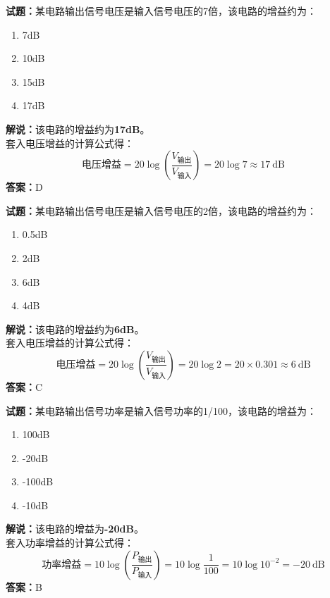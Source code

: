 \documentclass{ctexbook}
\begin{document}
\noindent\textbf{试题：}某电路输出信号电压是输入信号电压的7倍，该电路的增益约为：
\begin{enumerate}[leftmargin=3em]
	\item 7dB
	\item 10dB
	\item 15dB
	\item 17dB%
\end{enumerate}
\noindent\textbf{解说：}该电路的增益约为\textbf{17dB}。\\
套入电压增益的计算公式得：
$$\mbox{电压增益}=20 \log \left( {\frac{V_{ \mbox{输出} }}{V_{ \mbox{输入} }}} \right)=20 \log 7 \approx17 \ \mathrm{dB}$$
\noindent\textbf{答案：}D



\bigskip


\noindent\textbf{试题：}某电路输出信号电压是输入信号电压的2倍，该电路的增益约为：
\begin{enumerate}[leftmargin=3em]
\item 0.5dB
\item 2dB
\item 6dB
\item 4dB
\end{enumerate}
\noindent\textbf{解说：}该电路的增益约为\textbf{6dB}。\\
套入电压增益的计算公式得：
$$\mbox{电压增益}=20 \log \left( {\frac{V_{ \mbox{输出} }}{V_{ \mbox{输入} }}} \right)=20 \log 2 = 20 \times 0.301 \approx 6 \ \mathrm{dB}$$
\noindent\textbf{答案：}C





\bigskip


\noindent\textbf{试题：}某电路输出信号功率是输入信号功率的1/100，该电路的增益为：
\begin{enumerate}[leftmargin=3em]
\item 100dB
\item -20dB
\item -100dB
\item -10dB
\end{enumerate}
\noindent\textbf{解说：}该电路的增益为\textbf{-20dB}。\\
套入功率增益的计算公式得：
$$\mbox{功率增益}=10 \log \left( {\frac{P_{ \mbox{输出} }}{P_{ \mbox{输入} }}} \right)=10 \log \frac{1}{100}=10 \log 10^{-2}=-20 \ \mathrm{dB}$$
\noindent\textbf{答案：}B




\bigskip
\end{document}

